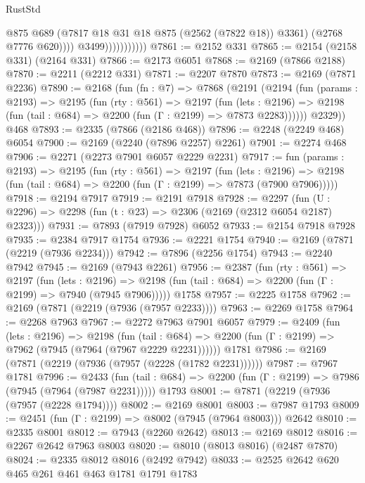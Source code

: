 \begin{lexlean}{RustStd}
\begin{coremodule}
{\begin{coremodule}
{{{{{{{{{{{{{{{                                @875
                                @689
                                (@7817 @18 @31 @18 @875 (@2562 (@7822 @18)) @3361)
                                (@2768 @7776 @620))))
                          @3499)))))))))))
@7861 := @2152 @331
@7865 := @2154 (@2158 @331) (@2164 @331)
@7866 := @2173 @6051
@7868 := @2169 (@7866 @2188)
@7870 := @2211 (@2212 @331)
@7871 := @2207 @7870
@7873 := @2169 (@7871 @2236)
@7890 := @2168
    (fun (fn : @7) =>
    @7868
      (@2191
        (@2194
          (fun (params : @2193) =>
          @2195
            (fun (rty : @561) =>
            @2197
              (fun (lets : @2196) =>
              @2198 (fun (tail : @684) => @2200 (fun (Γ : @2199) => @7873 @2283))))))
        @2329))
    @468
@7893 := @2335 (@7866 (@2186 @468))
@7896 := @2248 (@2249 @468) @6054
@7900 := @2169 (@2240 (@7896 @2257) @2261)
@7901 := @2274 @468
@7906 := @2271 (@2273 @7901 @6057 @2229 @2231)
@7917 := fun (params : @2193) =>
  @2195
    (fun (rty : @561) =>
    @2197
      (fun (lets : @2196) =>
      @2198 (fun (tail : @684) => @2200 (fun (Γ : @2199) => @7873 (@7900 @7906)))))
@7918 := @2194 @7917
@7919 := @2191 @7918
@7928 := @2297 (fun (U : @2296) => @2298 (fun (t : @23) => @2306 (@2169 (@2312 @6054 @2187) @2323)))
@7931 := @7893 (@7919 @7928) @6052
@7933 := @2154 @7918 @7928
@7935 := @2384 @7917 @1754
@7936 := @2221 @1754
@7940 := @2169 (@7871 (@2219 (@7936 @2234)))
@7942 := @7896 (@2256 @1754)
@7943 := @2240 @7942
@7945 := @2169 (@7943 @2261)
@7956 := @2387
    (fun (rty : @561) =>
    @2197
      (fun (lets : @2196) =>
      @2198 (fun (tail : @684) => @2200 (fun (Γ : @2199) => @7940 (@7945 @7906)))))
    @1758
@7957 := @2225 @1758
@7962 := @2169 (@7871 (@2219 (@7936 (@7957 @2233))))
@7963 := @2269 @1758
@7964 := @2268 @7963
@7967 := @2272 @7963 @7901 @6057
@7979 := @2409
    (fun (lets : @2196) =>
    @2198
      (fun (tail : @684) => @2200 (fun (Γ : @2199) => @7962 (@7945 (@7964 (@7967 @2229 @2231))))))
    @1781
@7986 := @2169 (@7871 (@2219 (@7936 (@7957 (@2228 (@1782 @2231))))))
@7987 := @7967 @1781
@7996 := @2433
    (fun (tail : @684) => @2200 (fun (Γ : @2199) => @7986 (@7945 (@7964 (@7987 @2231)))))
    @1793
@8001 := @7871 (@2219 (@7936 (@7957 (@2228 @1794))))
@8002 := @2169 @8001
@8003 := @7987 @1793
@8009 := @2451 (fun (Γ : @2199) => @8002 (@7945 (@7964 @8003))) @2642
@8010 := @2335 @8001
@8012 := @7943 (@2260 @2642)
@8013 := @2169 @8012
@8016 := @2267 @2642 @7963 @8003
@8020 := @8010 (@8013 @8016) (@2487 @7870)
@8024 := @2335 @8012 @8016 (@2492 @7942)
@8033 := @2525 @2642 @620 @465 @261 @461 @463 @1781 @1791 @1783
}}}}}}}}}}}}}}}
\end{coremodule}}
\end{coremodule}
\end{lexlean}
